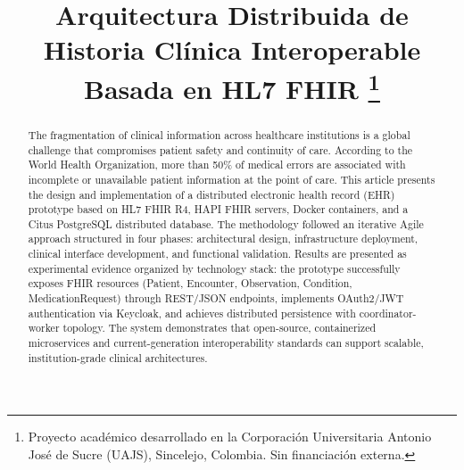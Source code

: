 \documentclass[conference]{IEEEtran}
\begin{document}
\title{Arquitectura Distribuida de Historia Cl\'inica Interoperable
Basada en HL7 FHIR%
\thanks{Proyecto acad\'emico desarrollado en la Corporaci\'on
Universitaria Antonio Jos\'e de Sucre (UAJS), Sincelejo, Colombia.
Sin financiaci\'on externa.}
}

\author{
\and
{}
\and
{}
}

\maketitle

\begin{abstract}
The fragmentation of clinical information across healthcare institutions
is a global challenge that compromises patient safety and continuity of
care. According to the World Health Organization, more than 50\% of
medical errors are associated with incomplete or unavailable patient
information at the point of care. This article presents the design and
implementation of a distributed electronic health record (EHR) prototype
based on HL7 FHIR R4, HAPI FHIR servers, Docker containers, and a Citus
PostgreSQL distributed database. The methodology followed an iterative
Agile approach structured in four phases: architectural design,
infrastructure deployment, clinical interface development, and functional
validation. Results are presented as experimental evidence organized
by technology stack: the prototype successfully exposes FHIR resources
(Patient, Encounter, Observation, Condition, MedicationRequest) through
REST/JSON endpoints, implements OAuth2/JWT authentication via Keycloak,
and achieves distributed persistence with coordinator-worker topology.
The system demonstrates that open-source, containerized microservices
and current-generation interoperability standards can support scalable,
institution-grade clinical architectures.
\end{abstract}
\end{document}
